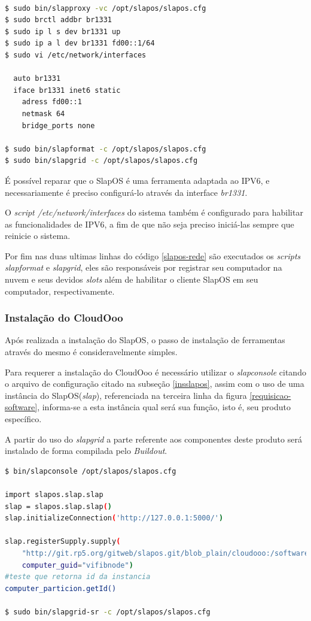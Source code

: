 {\singlespace
\begin{lstlisting}[caption=Configurações de rede do SlapOS,language=bash,label={slapos-rede}]

$ sudo bin/slapproxy -vc /opt/slapos/slapos.cfg
$ sudo brctl addbr br1331
$ sudo ip l s dev br1331 up
$ sudo ip a l dev br1331 fd00::1/64
$ sudo vi /etc/network/interfaces

  auto br1331
  iface br1331 inet6 static
    adress fd00::1
    netmask 64
    bridge_ports none

$ sudo bin/slapformat -c /opt/slapos/slapos.cfg
$ sudo bin/slapgrid -c /opt/slapos/slapos.cfg

\end{lstlisting}
}

É possível reparar que o SlapOS é uma ferramenta adaptada ao IPV6, e necessariamente é preciso configurá-lo através da interface \textit{br1331}.

O \textit{script /etc/network/interfaces} do sistema também é configurado para habilitar as funcionalidades de IPV6, a fim de que não seja preciso iniciá-las sempre que reinicie o sistema.

Por fim nas duas ultimas linhas do código \ref{slapos-rede} são executados os \textit{scripts slapformat}  e \textit{slapgrid}, eles são responsáveis por registrar seu computador na nuvem e seus devidos \textit{slots} além de habilitar o cliente SlapOS em seu computador, respectivamente.


\subsubsection{Instalação do CloudOoo}

Após realizada a instalação do SlapOS, o passo de instalação de ferramentas através do mesmo é consideravelmente simples.

Para requerer a instalação do CloudOoo é necessário utilizar o \textit{slapconsole} citando o arquivo de configuração citado na subseção \ref{insslapos}, assim com o uso de uma instância do SlapOS(\textit{slap}), referenciada na terceira linha da figura \ref{requisicao-software}, informa-se a esta instância qual será sua função, isto é, seu produto específico. 

A partir do uso do \textit{slapgrid} a parte referente aos componentes deste produto será instalado de forma compilada pelo \textit{Buildout}.


{\singlespace
\begin{lstlisting}[caption=Requisição de instalação do CloudOoo no SlapOS,language=bash,label={requisicao-software}]
$ bin/slapconsole /opt/slapos/slapos.cfg

import slapos.slap.slap
slap = slapos.slap.slap()
slap.initializeConnection('http://127.0.0.1:5000/')

slap.registerSupply.supply(
    "http://git.rp5.org/gitweb/slapos.git/blob_plain/cloudooo:/software/cloudooo/software.cfg",
    computer_guid="vifibnode")
#teste que retorna id da instancia
computer_particion.getId()

$ sudo bin/slapgrid-sr -c /opt/slapos/slapos.cfg

\end{lstlisting}
}

